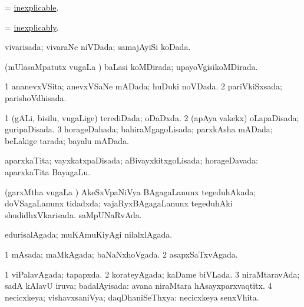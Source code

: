 \bentry
{} 
\gl{\gu}
\expl{}
\bmng
 = \hyperref{kandict_i.pdf}{I}{inexplicable}{inexplicable}. 
\emng
\eentry

\bentry
{} 
\gl{\kirxvi}
\expl{}
\bmng
 = \hyperref{kandict_i.pdf}{I}{inexplicably}{inexplicably}. 
\emng
\eentry

\bentry
{} 
\gl{\gu}
\expl{}
\bmng
 vivarisada; vivaraNe niVDada; samajAyiSi koDada. 
\emng
\eentry

\bentry
{} 
\gl{\gu}
\expl{}
\bmng
 (mUlasaMpatutx \mo vugaLa \vi) baLasi koMDirada; upayoVgisikoMDirada. 
\emng
\eentry

\bentry
{} 
\gl{\gu}
\expl{}
\bmng
\bnum
\num{1} ananevxVSita; anevxVSaNe mADada; huDuki noVDada. 
\num{2} pariVkiSxsada; parishoVdhisada. 
\enum
\emng
\eentry

\bentry
{} 
\gl{\gu}
\expl{}
\bmng
\bnum
\num{1} (gALi, bisilu, \mo vugaLige) terediDada; oDaDxda. 
\num{2} (apAya \mo vakekx) oLapaDisada; guripaDisada. 
\num{3} horageDahada; bahiraMgagoLisada; parxkAsha mADada; beLakige tarada; bayalu mADada. 
\enum
\emng
\eentry

\bentry
{} 
\gl{\gu}
\expl{}
\bmng
 aparxkaTita; vayxkatxpaDisada; aBivayxkitxgoLisada; horageDavada:  aparxkaTita BayagaLu. 
\emng
\eentry

\bentry
{} 
\gl{\gu}
\expl{}
\bmng
 (garxMtha \mo vugaLa \vi) 
\banum
{} AkeSxVpaNiVya BAgagaLanunx tegeduhAkada; doVSagaLanunx tidadxda; vajaRyxBAgagaLanunx tegeduhAki shudidhxVkarisada. 
 saMpUNaRvAda. 
\eanum
\emng
\eentry

\bentry
{} 
\gl{\gu}
\expl{}
\bmng
 edurisalAgada; muKAmuKiyAgi nilalxlAgada. 
\emng
\eentry

\bentry
{} 
\gl{\gu}
\expl{}
\bmng
\bnum
\num{1} mAsada; maMkAgada; baNaNxhoVgada. 
\num{2} asapxSaTxvAgada. 
\enum
\emng
\eentry

\bentry
{} 
\gl{\gu}
\expl{}
\bmng
\bnum
\num{1} viPalavAgada; tapapxda. 
\num{2} korateyAgada; kaDame biVLada. 
\num{3} niraMtaravAda; sadA kAlavU iruva; badalAyisada:  avana niraMtara hAsayxparxvaqtitx. 
\num{4} necicxkeya; vishavxsaniVya; daqDhaniSeThxya:  necicxkeya senxVhita. 
\enum
\emng
\eentry

